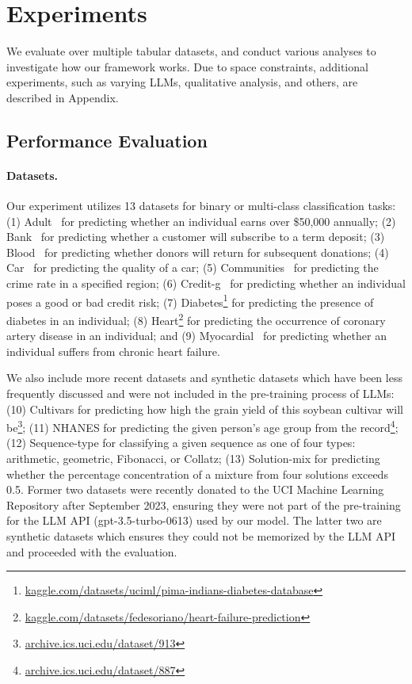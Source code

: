 \documentclass{article}
\theoremstyle{plain}
\theoremstyle{definition}
\theoremstyle{remark}
\begin{document}
\section{Experiments}
We evaluate \model{} over multiple tabular datasets, and conduct various analyses to investigate how our framework works. Due to space constraints, additional experiments, such as varying LLMs, qualitative analysis, and others, are described in Appendix. 

\subsection{Performance Evaluation}
\paragraph{Datasets.}
Our experiment utilizes 13 datasets for binary or multi-class classification tasks: (1) Adult~\cite{asuncion2007uci} for predicting whether an individual earns over \$50,000 annually; (2) Bank~\cite{moro2014data} for predicting whether a customer will subscribe to a term deposit; (3) Blood~\cite{yeh2009knowledge} for predicting whether donors will return for subsequent donations; (4) Car~\cite{kadra2021well} for predicting the quality of a car; (5) Communities~\cite{misc_communities_and_crime_183} for predicting the crime rate in a specified region; (6) Credit-g~\cite{kadra2021well} for predicting whether an individual poses a good or bad credit risk; (7) Diabetes\footnote{\url{kaggle.com/datasets/uciml/pima-indians-diabetes-database}} for predicting the presence of diabetes in an individual; (8) Heart\footnote{\url{kaggle.com/datasets/fedesoriano/heart-failure-prediction}} for predicting the occurrence of coronary artery disease in an individual; and (9) Myocardial~\cite{misc_myocardial_infarction_complications_579} for predicting whether an individual suffers from chronic heart failure. 

We also include more recent datasets and synthetic datasets which have been less frequently discussed and were not included in the pre-training process of LLMs: (10) Cultivars for predicting how high the grain yield of this soybean cultivar will be\footnote{\url{archive.ics.uci.edu/dataset/913}}; (11) NHANES for predicting the given person's age group from the record\footnote{\url{archive.ics.uci.edu/dataset/887}}; (12) Sequence-type for classifying a given sequence as one of four types: arithmetic, geometric, Fibonacci, or Collatz; (13) Solution-mix for predicting whether the percentage concentration of a mixture from four solutions exceeds 0.5. Former two datasets were recently donated to the UCI Machine Learning Repository after September 2023, ensuring they were not part of the pre-training for the LLM API (gpt-3.5-turbo-0613) used by our model. The latter two are synthetic datasets which ensures they could not be memorized by the LLM API and proceeded with the evaluation.
\end{document}
